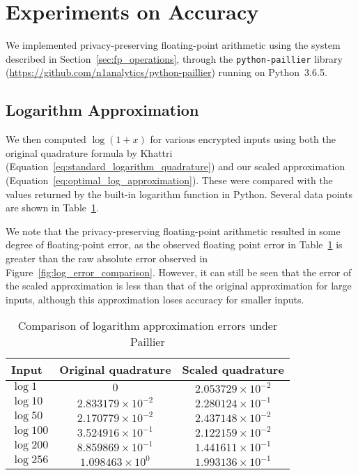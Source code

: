 \section{Experiments on Accuracy}
We implemented privacy-preserving floating-point arithmetic using the system described in Section~\ref{sec:fp_operations}, through the \texttt{python-paillier} library (\url{https://github.com/n1analytics/python-paillier}) running on Python~3.6.5.

\subsection{Logarithm Approximation}
We then computed $\log(1+x)$ for various encrypted inputs using both the original quadrature formula by Khattri (Equation~\ref{eq:standard_logarithm_quadrature}) and our scaled approximation (Equation~\ref{eq:optimal_log_approximation}). These were compared with the values returned by the built-in logarithm function in Python. Several data points are shown in Table~\ref{tab:log_approximation}.

We note that the privacy-preserving floating-point arithmetic resulted in some degree of floating-point error, as the observed floating point error in Table~\ref{tab:log_approximation} is greater than the raw absolute error observed in Figure~\ref{fig:log_error_comparison}. However, it can still be seen that the error of the scaled approximation is less than that of the original approximation for large inputs, although this approximation loses accuracy for smaller inputs.
\begin{table}[h]
	\caption{Comparison of logarithm approximation errors under Paillier}
	\label{tab:log_approximation}
	\begin{tabular}{lcc}
		\toprule
		Input & Original quadrature & Scaled quadrature\\
		\midrule
		$\log 1$ & $0$ & $2.053729 \times 10^{-2}$\\
		$\log 10$ & $2.833179 \times 10^{-2} $ & $2.280124 \times 10^{-1}$\\
		$\log 50$ & $2.170779 \times 10^{-2}$ & $2.437148 \times 10^{-2}$\\
		$\log 100$ & $3.524916 \times 10^{-1}$ & $2.122159 \times 10^{-2}$\\
		$\log 200$ & $8.859869 \times 10^{-1}$ & $1.441611 \times 10^{-1}$\\
		$\log 256$ & $1.098463 \times 10^{0}$ & $1.993136 \times 10^{-1}$\\
	\bottomrule
\end{tabular}
\end{table}

